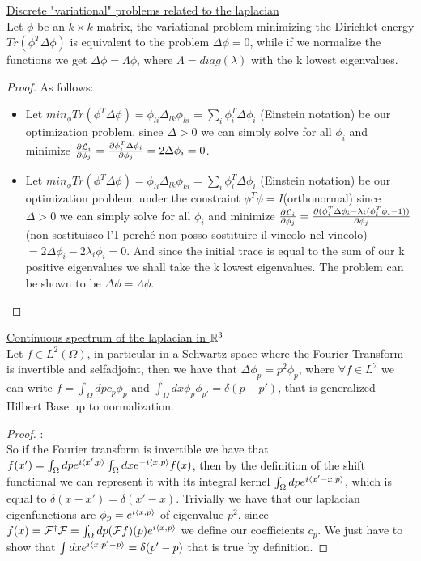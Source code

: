 \documentclass[../main.tex]{subfiles}
\begin{document}
\begin{prop}
    \underline{Discrete "variational" problems related to the laplacian}\\
    Let $\phi$ be an $k \times k$ matrix, the variational problem minimizing the Dirichlet energy $Tr(\phi^T \Delta \phi)$ is equivalent to
    the problem $\Delta \phi = 0$, while if we normalize the functions we get $\Delta \phi = \Lambda \phi$, where $\Lambda = diag(\lambda)$ with 
    the k lowest eigenvalues.
\end{prop}
\begin{proof} As follows:\\
    \begin{itemize}
        \item
	Let $min_{\phi}Tr(\phi^T \Delta \phi) = \phi_{li}\Delta_{lk}\phi_{ki} = \sum_i \phi_i^T \Delta \phi_i $ (Einstein notation) be our optimization problem,
	since $\Delta > 0$ we can simply solve for all $\phi_i$ and minimize $\frac{\partial \mathcal{L}_i}{\partial \phi_j} = \frac{\partial \phi_i^T \Delta \phi_i}{\partial \phi_j}
	 = 2\Delta\phi_i=0$.
	 \item
	Let $min_{\phi}Tr(\phi^T \Delta \phi) = \phi_{li}\Delta_{lk}\phi_{ki} = \sum_i \phi_i^T \Delta \phi_i $ (Einstein notation) be our optimization problem,
        under the constraint $\phi^T \phi = I$(orthonormal) since $\Delta > 0$ we can simply solve for all $\phi_i$ and minimize 
	$\frac{\partial \mathcal{L}_i}{\partial \phi_j} = \frac{\partial (\phi_i^T \Delta \phi_i -\lambda_i(\phi_i^T\phi_i -1))}{\partial \phi_j}$(non sostituisco l'1 perché non posso sostituire il vincolo 
	nel vincolo)$ = 2\Delta\phi_i-2\lambda_i\phi_i=0$. And since the initial trace is equal to the sum of our k positive eigenvalues we shall take the
	k lowest eigenvalues. The problem can be shown to be $\Delta \phi = \Lambda \phi$.
   \end{itemize}
\end{proof}

\begin{prop}
    \underline{Continuous spectrum of the laplacian in $\mathbb{R}^3$}\\
    Let $f \in L^2(\Omega)$, in particular in a Schwartz space where the Fourier Transform is invertible and selfadjoint,
    then we have that $\Delta \phi_p = p^2 \phi_p$, where $\forall f \in L^2$ we can write $f = \int_\Omega dp c_p \phi_p$
    and $\int_\Omega dx \phi_p \phi_{p'} = \delta(p-p')$, that is generalized Hilbert Base up to normalization.
\end{prop}
\begin{proof}:\\
    So if the Fourier transform is invertible we have that $f(x') = \int_\Omega dp e^{i\langle x', p \rangle}\int_\Omega dx e^{-i\langle x, p \rangle}f(x)$, 
    then by the definition of the shift functional we can represent it with its integral kernel $\int_\Omega dp e^{i\langle x'-x, p \rangle}$, which
    is equal to $\delta(x-x') = \delta(x'-x)$. Trivially we have that our laplacian eigenfunctions are $\phi_p = e^{i\langle x, p \rangle}$ of eigenvalue $p^2$, since 
    $f(x) = \mathcal{F}^\dag \mathcal{F} = \int_\Omega dp (\mathcal{F}f)(p)e^{i\langle x, p \rangle}$ we define our coefficients $c_p$. We just have to show that
    $\int dx e^{i\langle x, p'-p \rangle} = \delta(p'-p)$ that is true by definition.
\end{proof}
    

\end{document}
